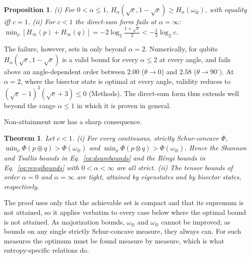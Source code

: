 \documentclass[11pt]{article}
\newtheorem{theorem}{Theorem}
\newtheorem{proposition}{Proposition}
\theoremstyle{definition}
\newcommand{\omplus}{\omega_{\oplus}}
\newcommand{\omtimes}{\omega_{\otimes}}
\newcommand{\sqc}{\sqrt{c}}
\begin{document}
\begin{proposition}\label{prop:renyi}
(i) For $0<\alpha\le1$, $H_\alpha(\sqc,1-\sqc)\ge H_\alpha(\omtimes)$, with equality iff
$c=1$. (ii) For $c<1$ the direct-sum form fails at $\alpha=\infty$:
$\min_\rho[H_\infty(p)+H_\infty(q)]=-2\log_2\frac{1+\sqc}2<-\frac12\log_2c$.
\end{proposition}

The failure, however, sets in only beyond $\alpha=2$. Numerically, for qubits
$H_\alpha(\sqc,1-\sqc)$ is a valid bound for every $\alpha\le2$ at every angle, and
fails above an angle-dependent order between $2.00$ ($\theta\to0$) and $2.58$
($\theta\to90^\circ$). At $\alpha=2$, where the bisector state is optimal at every
angle\cite{ZozorBosykPortesi2013}, validity reduces to $(\sqc-1)^3(\sqc+3)\le0$
(Methods). The direct-sum form thus extends well beyond the range $\alpha\le1$
in which it is proven in general.

Non-attainment now has a sharp consequence.

\begin{theorem}\label{thm:strict}
Let $c<1$. (i) For every continuous, strictly Schur-concave $\Phi$,
$\min_\rho\Phi(p\oplus q)>\Phi(\omplus)$ and $\min_\rho\Phi(p\otimes q)>\Phi(\omtimes)$.
Hence the Shannon and Tsallis bounds in Eq.~\eqref{eq:dsumbounds} and the R\'enyi
bounds in Eq.~\eqref{eq:renyibounds} with $0<\alpha<\infty$ are all strict.
(ii) The tensor bounds of order $\alpha=0$ and $\alpha=\infty$ are tight, attained
by eigenstates and by bisector states, respectively.
\end{theorem}

The proof uses only that the achievable set is compact and that its supremum is
not attained, so it applies verbatim to every case below where the optimal
bound is not attained. As majorization bounds, $\omplus$ and $\omtimes$ cannot be
improved; as bounds on any single strictly Schur-concave measure, they always
can. For such measures the optimum must be found measure by measure, which is
what entropy-specific relations do.
\end{document}
